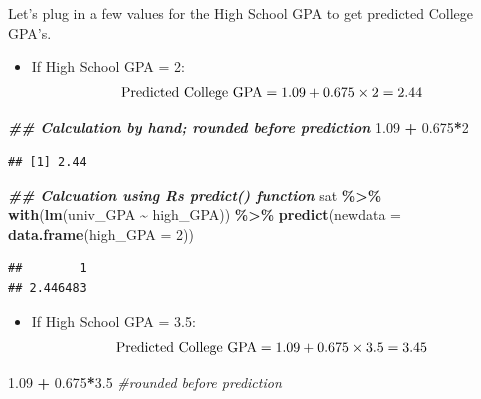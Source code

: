 \documentclass[
]{book}
\newenvironment{Shaded}{\begin{snugshade}}{\end{snugshade}}
\newcommand{\AttributeTok}[1]{\textcolor[rgb]{0.13,0.29,0.53}{#1}}
\newcommand{\CommentTok}[1]{\textcolor[rgb]{0.56,0.35,0.01}{\textit{#1}}}
\newcommand{\DecValTok}[1]{\textcolor[rgb]{0.00,0.00,0.81}{#1}}
\newcommand{\DocumentationTok}[1]{\textcolor[rgb]{0.56,0.35,0.01}{\textbf{\textit{#1}}}}
\newcommand{\FloatTok}[1]{\textcolor[rgb]{0.00,0.00,0.81}{#1}}
\newcommand{\FunctionTok}[1]{\textcolor[rgb]{0.13,0.29,0.53}{\textbf{#1}}}
\newcommand{\NormalTok}[1]{#1}
\newcommand{\SpecialCharTok}[1]{\textcolor[rgb]{0.81,0.36,0.00}{\textbf{#1}}}
\providecommand{\tightlist}{%
  \setlength{\itemsep}{0pt}\setlength{\parskip}{0pt}}
\begin{document}
Let's plug in a few values for the High School GPA to get predicted College GPA's.

\begin{itemize}
\tightlist
\item
  If High School GPA = 2:\\
  \[ \hbox{Predicted College GPA} = 1.09 + 0.675 \times 2 = 2.44 \]
\end{itemize}

\begin{Shaded}
\begin{Highlighting}[]
\DocumentationTok{\#\# Calculation by hand; rounded before prediction}
\FloatTok{1.09} \SpecialCharTok{+} \FloatTok{0.675}\SpecialCharTok{*}\DecValTok{2}
\end{Highlighting}
\end{Shaded}

\begin{verbatim}
## [1] 2.44
\end{verbatim}

\begin{Shaded}
\begin{Highlighting}[]
\DocumentationTok{\#\# Calcuation using R\textquotesingle{}s predict() function}
\NormalTok{sat }\SpecialCharTok{\%\textgreater{}\%}
  \FunctionTok{with}\NormalTok{(}\FunctionTok{lm}\NormalTok{(univ\_GPA }\SpecialCharTok{\textasciitilde{}}\NormalTok{ high\_GPA)) }\SpecialCharTok{\%\textgreater{}\%}
  \FunctionTok{predict}\NormalTok{(}\AttributeTok{newdata =} \FunctionTok{data.frame}\NormalTok{(}\AttributeTok{high\_GPA =} \DecValTok{2}\NormalTok{))}
\end{Highlighting}
\end{Shaded}

\begin{verbatim}
##        1 
## 2.446483
\end{verbatim}

\begin{itemize}
\tightlist
\item
  If High School GPA = 3.5:\\
  \[ \hbox{Predicted College GPA} = 1.09 + 0.675 \times 3.5 = 3.45 \]
\end{itemize}

\begin{Shaded}
\begin{Highlighting}[]
\FloatTok{1.09} \SpecialCharTok{+} \FloatTok{0.675}\SpecialCharTok{*}\FloatTok{3.5} \CommentTok{\#rounded before prediction}
\end{Highlighting}
\end{Shaded}
\end{document}
